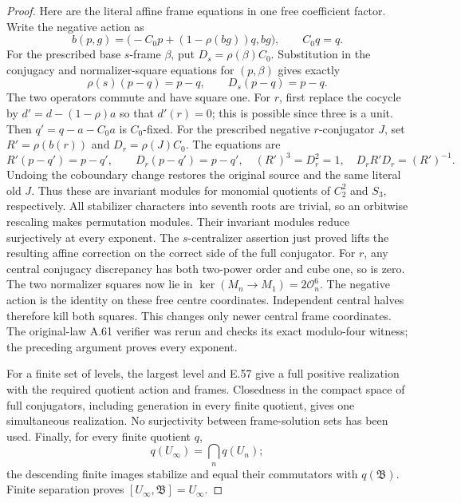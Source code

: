 \begin{proof}
Here are the literal affine frame equations in one free coefficient
factor.  Write the negative action as
\[
 b(p,g)=\bigl(-C_0p+(1-\rho(bg))q,bg\bigr),\qquad C_0q=q.
                                                        \tag{E.91.7}
\]
For the prescribed base \(s\)-frame \(\beta\), put
\(D_s=\rho(\beta)C_0\).  Substitution in the conjugacy and
normalizer-square equations for \((p,\beta)\) gives exactly
\[
 \rho(s)(p-q)=p-q,\qquad D_s(p-q)=p-q.                   \tag{E.91.8}
\]
The two operators commute and have square one.  For \(r\), first
replace the cocycle by \(d'=d-(1-\rho)a\) so that \(d'(r)=0\);
this is possible since three is a unit.  Then
\(q'=q-a-C_0a\) is \(C_0\)-fixed.  For the prescribed
negative \(r\)-conjugator \(J\), set
\(R'=\rho(b(r))\) and \(D_r=\rho(J)C_0\).  The equations are
\[
 R'(p-q')=p-q',\qquad D_r(p-q')=p-q',
 \quad (R')^3=D_r^2=1,\quad D_rR'D_r=(R')^{-1}.          \tag{E.91.9}
\]
Undoing the coboundary change restores the original source and
the same literal old \(J\).  Thus these are invariant modules
for monomial quotients of \(C_2^2\) and \(S_3\), respectively.
All stabilizer characters into seventh roots are trivial,
so an orbitwise rescaling makes permutation modules.
Their invariant modules reduce surjectively at every exponent.
The \(s\)-centralizer assertion just proved lifts the resulting
affine correction on the correct side of the full conjugator.
For \(r\), any central conjugacy discrepancy has both
two-power order and cube one, so is zero.
The two normalizer squares now lie in
\(\ker(M_n\to M_1)=2\mathcal O_n^6\).
The negative action is the identity on these free centre coordinates.
Independent central halves therefore kill both squares.
This changes only newer central frame coordinates.
The original-law A.61 verifier was rerun and checks its exact
modulo-four witness; the preceding argument proves every exponent.

For a finite set of levels, the largest level and E.57 give a
full positive realization with the required quotient action
and frames.  Closedness in the compact space of full conjugators,
including generation in every finite quotient, gives one
simultaneous realization.  No surjectivity between frame-solution
sets has been used.
Finally, for every finite quotient \(q\),
\[
 q(U_\infty)=\bigcap_nq(U_n);
\]
the descending finite images stabilize and equal their commutators
with \(q(\mathfrak B)\).  Finite separation proves
\([U_\infty,\mathfrak B]=U_\infty\).
\end{proof}

